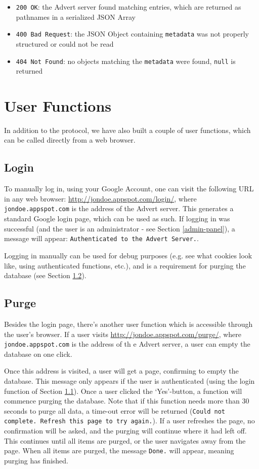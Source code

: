 \documentclass[a4paper,10pt]{article}
\begin{document}
\begin{itemize}
  \item \texttt{200 OK}: the Advert server found matching entries, which are
  returned as pathnames in a serialized JSON Array
  \item \texttt{400 Bad Request}: the JSON Object containing \texttt{metadata}
  was not properly structured or could not be read
  \item \texttt{404 Not Found}: no objects matching the \texttt{metadata} were
  found, \texttt{null} is returned
\end{itemize}

\section{User Functions}
In addition to the protocol, we have also built a couple of user functions,
which can be called directly from a web browser.

\subsection{Login}
\label{login}
To manually log in, using your Google Account, one can visit the following URL
in any web browser: \url{http://jondoe.appspot.com/login/}, where
\texttt{jondoe.appspot.com} is the address of the Advert server. This generates
a standard Google login page, which can be used as such. If logging in was
successful (and the user is an administrator - see Section \ref{admin-panel}),
a message will appear: \texttt{Authenticated to the Advert Server.}.

Logging in manually can be used for debug purposes (e.g. see what cookies look
like, using authenticated functions, etc.), and is a requirement for purging
the database (see Section \ref{purge}).

\subsection{Purge}
\label{purge}
Besides the login page, there's another user function which is accessible
through the user's browser. If a user visits
\url{http://jondoe.appspot.com/purge/}, where \texttt{jondoe.appspot.com} is the
address of th e Advert server, a user can empty the database on one click. 

Once this address is visited, a user will get a page, confirming to empty the
database. This message only appears if the user is authenticated (using the
login function of Section \ref{login}). Once a user clicked the `Yes'-button, a
function will commence purging the database. Note that if this function needs
more than 30 seconds to purge all data, a time-out error will be returned
(\texttt{Could not complete. Refresh this page to try again.}). If a user
refreshes the page, no confirmation will be asked, and the purging will
continue where it had left off. This continues until all items are purged, or
the user navigates away from the page. When all items are purged, the message 
\texttt{Done.} will appear, meaning purging has finished.
\end{document}

